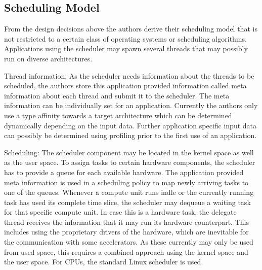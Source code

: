 \documentclass[a4paper,13pt]{article}
\begin{document}
\begin{multicols}{2}
\subsection{Scheduling Model}

From the design decisions above the authors derive their scheduling model that is not restricted to a certain 
class of operating systems or scheduling algorithms. Applications using the scheduler may spawn 
several threads that may possibly run on diverse architectures.

Thread information: As the scheduler needs information about the threads to be scheduled, the authors
store this application provided information called meta information about each thread and submit it 
to the scheduler. The meta information can be individually set for an application. Currently the 
authors only use a type affinity towards a target architecture which can be determined dynamically
depending on  the input data. Further application specific input data can possibly be determined 
using profiling prior to the first use of an application.

Scheduling: The scheduler component may be located in the kernel space as well as the user space. To
assign tasks to certain hardware components, the scheduler has to provide a queue for each available
hardware. The application provided meta information is used in a scheduling policy to map newly 
arriving tasks to one of the queues. Whenever a compute unit runs indle or the currently running 
task has used  its complete time slice, the scheduler may dequeue a waiting task for that specific
compute unit. In case this is a hardware task, the delegate thread receives the information that it
may run its hardware counterpart. This includes using   the proprietary drivers of the hardware, which
are inevitable for the communication with some accelerators. As these currently may only be used from
used space, this requires a combined approach using the kernel space and the user space. For CPUs, 
the standard Linux scheduler is used.


\end{multicols}
\end{document}
